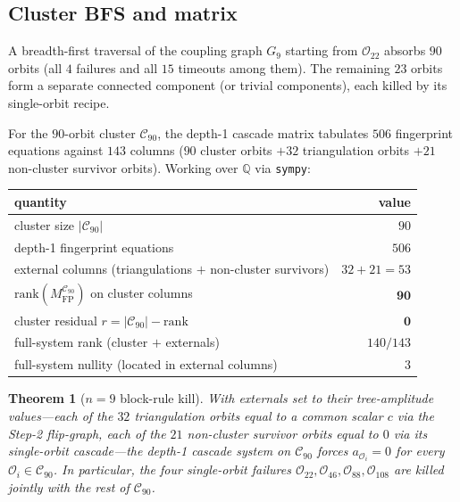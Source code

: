 \documentclass[11pt]{article}
\newtheorem{thm}{Theorem}
\theoremstyle{definition}
\begin{document}
\subsection{Cluster BFS and matrix}\label{subsec:cluster}

A breadth-first traversal of the coupling graph $G_9$ starting from
$\mathcal O_{22}$ absorbs $90$ orbits (all $4$ failures and all $15$
timeouts among them). The remaining $23$ orbits form a separate
connected component (or trivial components), each killed by its
single-orbit recipe.

For the $90$-orbit cluster $\mathcal C_{90}$, the depth-1 cascade
matrix tabulates $506$ fingerprint equations against $143$ columns
($90$ cluster orbits $+ 32$ triangulation orbits $+ 21$ non-cluster
survivor orbits). Working over $\mathbb Q$ via \texttt{sympy}:

\begin{center}\small
\begin{tabular}{lr}
\toprule
quantity & value\\
\midrule
cluster size $|\mathcal C_{90}|$ & $90$\\
depth-1 fingerprint equations & $506$\\
external columns (triangulations $+$ non-cluster survivors) & $32+21=53$\\
$\mathrm{rank}(M_{\mathrm{FP}}^{\mathcal C_{90}})$ on cluster columns & $\boldsymbol{90}$\\
cluster residual $r=|\mathcal C_{90}|-\mathrm{rank}$ & $\boldsymbol{0}$\\
full-system rank (cluster $+$ externals) & $140/143$\\
full-system nullity (located in external columns) & $3$\\
\bottomrule
\end{tabular}
\end{center}

\begin{thm}[$n=9$ block-rule kill]\label{thm:n9}
With externals set to their tree-amplitude values---each of the $32$
triangulation orbits equal to a common scalar $c$ via the Step-2
flip-graph, each of the $21$ non-cluster survivor orbits equal to
$0$ via its single-orbit cascade---the depth-1 cascade system on
$\mathcal C_{90}$ forces $a_{\mathcal O_i}=0$ for every
$\mathcal O_i\in\mathcal C_{90}$. In particular, the four
single-orbit failures
$\mathcal O_{22},\mathcal O_{46},\mathcal O_{88},\mathcal O_{108}$
are killed jointly with the rest of $\mathcal C_{90}$.
\end{thm}
\end{document}
